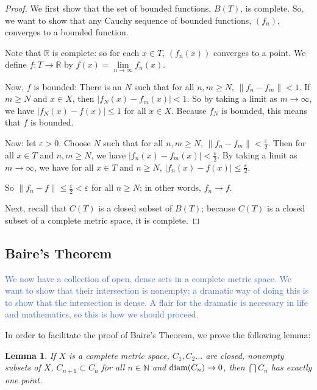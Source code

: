 \documentclass{amsart}
\newcommand{\vep}{\varepsilon}
\newcommand{\N}{\mathbb{N}}
\newcommand{\R}{\mathbb{R}}
\newcommand{\diam}{\text{\rm diam}}
\newcommand{\colorcomment}[2]{\textcolor{#1}{#2}} %
\newcommand{\absval}[1]{\left| #1 \right|}
\newcommand{\norm}[1]{\|#1\|}
\newtheorem{lem}[thm]{Lemma}
\theoremstyle{definition}
\begin{document}
\begin{proof}
We first show that the set of bounded functions, $B(T)$, is complete.
So, we want to show that any Cauchy sequence of bounded functions, $(f_n)$, converges to a bounded function.

Note that $\R$ is complete: so for each $x \in T$, $(f_n(x))$ converges to a point. We define $f: T \to \R$ by $f(x) = \lim\limits_{n \to \infty} f_n(x)$.

Now, $f$ is bounded: 
There is an $N$ such that for all $n,m \geq N$, $\norm{f_n-f_m} < 1$.
If $m \geq N$ and $x \in X$, then $\absval{f_N(x) - f_m(x)} < 1$.
So by taking a limit as $m \to \infty$, we have $\absval{f_N(x) - f(x)} \leq 1$ for all $x \in X$.
Because $f_N$ is bounded, this means that $f$ is bounded.

Now: let $\vep >0$. Choose $N$ such that for all $n,m \geq N$, $\norm{f_n-f_m} < \frac{\vep}{2}$. 
Then for all $x \in T$ and $n,m \geq N$, we have $\absval{f_n(x) - f_m(x)} < \frac{\vep}{2}$.
By taking a limit as $m \to \infty$, we have for all $x \in T$ and $n \geq N$, $\absval{f_n(x) - f(x)} \leq \frac{\vep}{2}$.

So $\norm{f_n - f} \leq \frac{\vep}{2} < \vep$ for all $n \geq N$; in other words, $f_n \to f$.

Next, recall that $C(T)$ is a closed subset of $B(T)$; because $C(T)$ is a closed subset of a complete metric space, it is complete.

\end{proof}

\subsection{Baire's Theorem}

\colorcomment{RoyalBlue}{We now have a collection of open, dense sets in a complete metric space. 
We want to show that their intersection is nonempty; a dramatic way of doing this is to show that the intersection is dense. 
A flair for the dramatic is necessary in life and mathematics, so this is how we should proceed.}

In order to facilitate the proof of Baire's Theorem, we prove the following lemma:

\begin{lem}
If $X$ is a complete metric space, $C_1, C_2 \ldots$ are closed, nonempty subsets of $X$, $C_{n+1} \subset C_n$ for all $n \in \N$ and $\diam(C_n) \to 0$, then $\bigcap C_n$ has exactly one point.
\end{lem}
\end{document}
